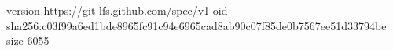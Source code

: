 version https://git-lfs.github.com/spec/v1
oid sha256:c03f99a6ed1bde8965fc91c94e6965cad8ab90c07f85de0b7567ee51d33794be
size 6055
